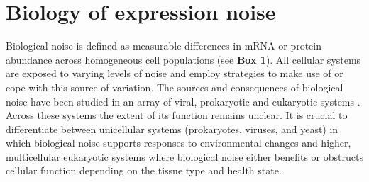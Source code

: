 
\section{Biology of expression noise} 

Biological noise is defined as measurable differences in \gls{mRNA} or protein abundance across homogeneous cell populations (see \textbf{Box 1}). All cellular systems are exposed to varying levels of noise and employ strategies to make use of or cope with this source of variation. The sources and consequences of biological noise have been studied in an array of viral, prokaryotic and eukaryotic systems \citep{Raj2010, Balazsi2011, Eldar2010}. Across these systems the extent of its function remains unclear. It is crucial to differentiate between unicellular systems (prokaryotes, viruses, and yeast) in which biological noise supports responses to environmental changes and higher, multicellular eukaryotic systems where biological noise either benefits or obstructs cellular function depending on the tissue type and health state.\\

